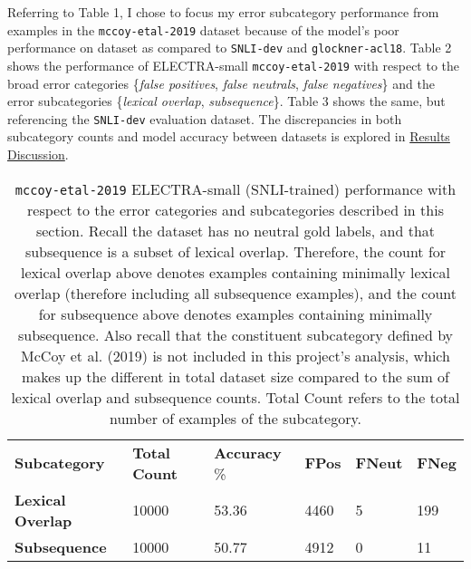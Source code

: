 \documentclass[11pt,a4paper]{article}
\begin{document}
Referring to Table 1, I chose to focus my error subcategory performance from examples in the \texttt{mccoy-etal-2019} dataset because of the model's poor performance on dataset as compared to \texttt{SNLI-dev} and \texttt{glockner-acl18}. Table 2 shows the performance of ELECTRA-small \texttt{mccoy-etal-2019} with respect to the broad error categories \{\textit{false positives}, \textit{false neutrals}, \textit{false negatives}\} and the error subcategories \{\textit{lexical overlap}, \textit{subsequence}\}. Table 3 shows the same, but referencing the \texttt{SNLI-dev} evaluation dataset. The discrepancies in both subcategory counts and model accuracy between datasets is explored in \hyperref[sec:rd]{Results Discussion}.

\begin{table}[hbt!]
\begin{center}
\begin{tabular}
{p{}|p{} p{} p{} p{} p{} }
  \hline
  {\tiny \textbf{Subcategory}} & {\tiny \textbf{Total} \textbf{Count}} & {\tiny \textbf{Accuracy} {\%}} & {\tiny \textbf{FPos}} & {\tiny \textbf{FNeut}} & {\tiny \textbf{FNeg}} \\

  {\tiny \textbf{Lexical Overlap}} & {\tiny 10000} & {\tiny 53.36} & {\tiny 4460} & {\tiny 5} & {\tiny 199} \\

  {\tiny \textbf{Subsequence}} & {\tiny 10000} & {\tiny 50.77} & {\tiny 4912} & {\tiny 0} & {\tiny 11} \\
\end{tabular}
\end{center}
\caption{\texttt{mccoy-etal-2019} ELECTRA-small (SNLI-trained) performance with respect to the error categories and subcategories described in this section. Recall the dataset has no neutral gold labels, and that subsequence is a subset of lexical overlap. Therefore, the count for lexical overlap above denotes examples containing minimally lexical overlap (therefore including all subsequence examples), and the count for subsequence above denotes examples containing minimally subsequence. Also recall that the constituent subcategory defined by McCoy et al. (2019) is not included in this project's analysis, which makes up the different in total dataset size compared to the sum of lexical overlap and subsequence counts. Total Count refers to the total number of examples of the subcategory.}
\end{table}
\end{document}
